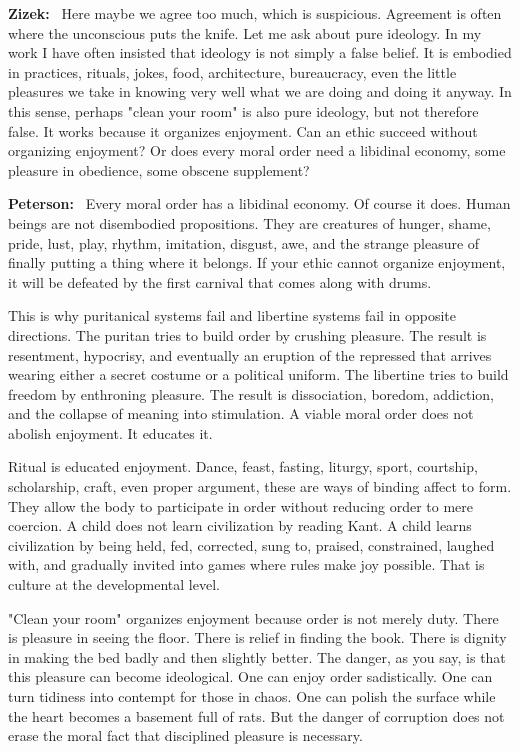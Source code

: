 \documentclass[a4paper,11pt]{article}
\newenvironment{question}{\par\noindent\color{ALIUSRed}\textbf{Zizek:}\ }{\par}
\newenvironment{answer}{\par\noindent\color{black}\textbf{Peterson:}\ }{\par}
\begin{document}
\begin{question}
Here maybe we agree too much, which is suspicious. Agreement is often where the unconscious puts the knife. Let me ask about pure ideology. In my work I have often insisted that ideology is not simply a false belief. It is embodied in practices, rituals, jokes, food, architecture, bureaucracy, even the little pleasures we take in knowing very well what we are doing and doing it anyway. In this sense, perhaps "clean your room" is also pure ideology, but not therefore false. It works because it organizes enjoyment. Can an ethic succeed without organizing enjoyment? Or does every moral order need a libidinal economy, some pleasure in obedience, some obscene supplement?
\end{question}

\begin{answer}
Every moral order has a libidinal economy. Of course it does. Human beings are not disembodied propositions. They are creatures of hunger, shame, pride, lust, play, rhythm, imitation, disgust, awe, and the strange pleasure of finally putting a thing where it belongs. If your ethic cannot organize enjoyment, it will be defeated by the first carnival that comes along with drums.

This is why puritanical systems fail and libertine systems fail in opposite directions. The puritan tries to build order by crushing pleasure. The result is resentment, hypocrisy, and eventually an eruption of the repressed that arrives wearing either a secret costume or a political uniform. The libertine tries to build freedom by enthroning pleasure. The result is dissociation, boredom, addiction, and the collapse of meaning into stimulation. A viable moral order does not abolish enjoyment. It educates it.

Ritual is educated enjoyment. Dance, feast, fasting, liturgy, sport, courtship, scholarship, craft, even proper argument, these are ways of binding affect to form. They allow the body to participate in order without reducing order to mere coercion. A child does not learn civilization by reading Kant. A child learns civilization by being held, fed, corrected, sung to, praised, constrained, laughed with, and gradually invited into games where rules make joy possible. That is culture at the developmental level.

"Clean your room" organizes enjoyment because order is not merely duty. There is pleasure in seeing the floor. There is relief in finding the book. There is dignity in making the bed badly and then slightly better. The danger, as you say, is that this pleasure can become ideological. One can enjoy order sadistically. One can turn tidiness into contempt for those in chaos. One can polish the surface while the heart becomes a basement full of rats. But the danger of corruption does not erase the moral fact that disciplined pleasure is necessary.


\end{answer}
\end{document}
